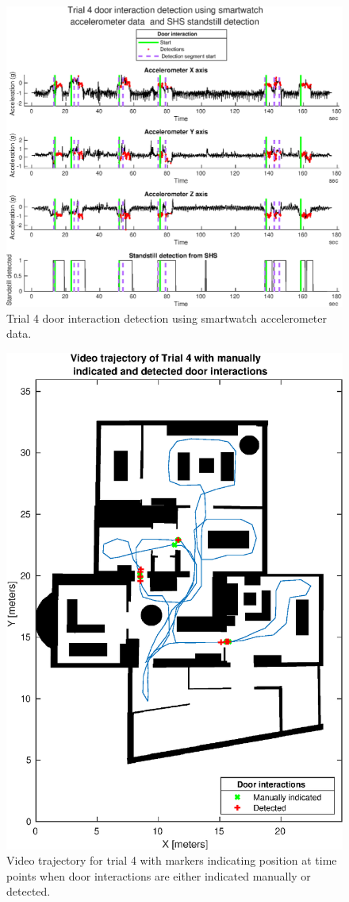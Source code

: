 \begin{figure}[H]
	\centering
	\includegraphics[width=0.8\linewidth]{images/20201201_1506_Trial_4_door_interaction_detection_using_smartwatch_1}
	\setlength{\belowcaptionskip}{-20pt}
	\caption{Trial 4 door interaction detection using smartwatch accelerometer data.}
	\label{fig:202011292140trial4doorinteractiondetectionusingsmartwatch1}
\end{figure}

\begin{figure}[H]
	\centering
	\includegraphics[width=0.7\linewidth]{images/20201129_2331_video_traj_Trial_4_door_detect_vs_manual_1}
	\setlength{\belowcaptionskip}{-20pt}
	\caption{Video trajectory for trial 4 with markers indicating position at time points when door interactions are either indicated manually or detected.}
	\label{fig:202011292331videotrajtrial4doordetectvsmanual1}
\end{figure}


